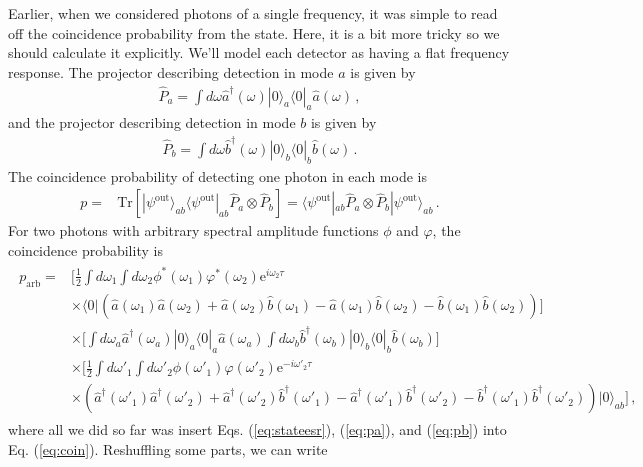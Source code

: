 \documentclass[12pt]{article}
\newcommand{\ket}[2] {| #1 \rangle_{#2}}
\newcommand{\bra}[2] {\langle #1 |_{#2}}
\newcommand{\dg}{^{\dagger}}
\newcommand{\ee}[1] {\mathrm{e}^{#1}}
\begin{document}
Earlier, when we considered photons of a single frequency,  it was simple to read off the coincidence probability from the state. Here, it is a bit more tricky so we should calculate it explicitly. We'll model each detector as having a flat frequency response. The projector describing detection in mode $a$ is given by
\begin{align}\label{eq:pa}
\hat{P}_{a}=\int d\omega\hat{a}\dg(\omega)\ket{0}{a}\bra{0}{a}\hat{a}(\omega)\,,
\end{align}
and the projector describing detection in mode $b$ is given by
\begin{align}\label{eq:pb}
\hat{P}_{b}=\int d\omega\hat{b}\dg(\omega)\ket{0}{b}\bra{0}{b}\hat{b}(\omega)\,.
\end{align}
The coincidence probability of detecting one photon in each mode is 
\begin{align}\label{eq:coin}
p={}&\mathrm{Tr}[\ket{\psi^{\mathrm{out}}}{ab}\bra{\psi^{\mathrm{out}}}{ab}\hat{P}_{a}\otimes\hat{P}_{b}]=\bra{\psi^{\mathrm{out}}}{ab}\hat{P}_{a}\otimes\hat{P}_{b}\ket{\psi^{\mathrm{out}}}{ab}\,.
\end{align}
For two photons with arbitrary spectral amplitude functions $\phi$ and $\varphi$, the coincidence probability is 
\begin{align}\label{eq:someeq}
\begin{split}
p_{\mathrm{arb}}={}&\Bigg[\frac{1}{2}\int d\omega_{1}\int d\omega_{2} \phi^*(\omega_{1}) \varphi^*(\omega_{2})\ee{i\omega_{2} \tau}\\
&\times\bra{0}{}\left(\hat{a}(\omega_{1})\hat{a}(\omega_{2})+\hat{a}(\omega_{2})\hat{b}(\omega_{1})-\hat{a}(\omega_{1})\hat{b}(\omega_{2})-\hat{b}(\omega_{1})\hat{b}(\omega_{2})\right)\Bigg]\\
&\times\Bigg[\int d\omega_{a}\hat{a}\dg(\omega_{a})\ket{0}{a}\bra{0}{a}\hat{a}(\omega_{a})\int d\omega_{b}\hat{b}\dg(\omega_{b})\ket{0}{b}\bra{0}{b}\hat{b}(\omega_{b})\Bigg]\\
&\times\Bigg[\frac{1}{2}\int d\omega'_{1} \int d\omega'_{2} \phi(\omega'_{1})\varphi(\omega'_{2})\ee{-i\omega'_{2} \tau}\\
&\times\left(\hat{a}\dg(\omega'_{1})\hat{a}\dg(\omega'_{2})+\hat{a}\dg(\omega'_{2})\hat{b}\dg(\omega'_{1})-\hat{a}\dg(\omega'_{1})\hat{b}\dg(\omega'_{2})-\hat{b}\dg(\omega'_{1})\hat{b}\dg(\omega'_{2})\right)\ket{0}{ab}\Bigg]\,,
\end{split}
\end{align}
where all we did so far was insert Eqs. (\ref{eq:stateesr}), (\ref{eq:pa}), and (\ref{eq:pb}) into Eq. (\ref{eq:coin}). Reshuffling some parts, we can write
\end{document}
